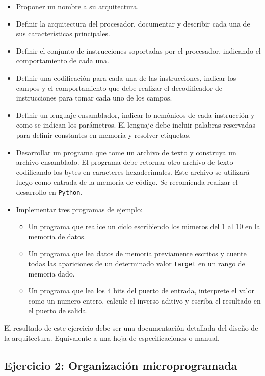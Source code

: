 \documentclass[a4paper,11pt]{article}
\begin{document}
\begin{itemize}
\item Proponer un nombre a su arquitectura.

\item Definir la arquitectura del procesador, documentar y describir cada una de sus características principales.

\item Definir el conjunto de instrucciones soportadas por el procesador, indicando el comportamiento de cada una.

\item Definir una codificación para cada una de las instrucciones, indicar los campos y el comportamiento que debe realizar el decodificador de instrucciones para tomar cada uno de los campos.

\item Definir un lenguaje ensamblador, indicar lo nemónicos de cada instrucción y como se indican los parámetros. El lenguaje debe incluir palabras reservadas para definir constantes en memoria y resolver etiquetas.

\item Desarrollar un programa que tome un archivo de texto y construya un archivo ensamblado. El programa debe retornar otro archivo de texto codificando los bytes en caracteres hexadecimales. Este archivo se utilizará luego como entrada de la memoria de código. Se recomienda realizar el desarrollo en \texttt{Python}.

\item Implementar tres programas de ejemplo:
\begin{itemize}
 \item Un programa que realice un ciclo escribiendo los números del 1 al 10 en la memoria de datos.
 \item Un programa que lea datos de memoria previamente escritos y cuente todas las apariciones de un determinado valor \texttt{target} en un rango de memoria dado.
 \item Un programa que lea los 4 bits del puerto de entrada, interprete el valor como un numero entero, calcule el inverso aditivo y escriba el resultado en el puerto de salida.
\end{itemize}
\end{itemize}

El resultado de este ejercicio debe ser una documentación detallada del diseño de la arquitectura. Equivalente a una hoja de especificaciones o manual.

\subsection{Ejercicio 2: Organización microprogramada}
\end{document}

